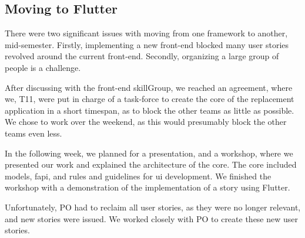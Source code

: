 \subsection{Moving to Flutter} \label{sec:moving-to-flutter}

There were two significant issues with moving from one framework to another, mid-semester. Firstly, implementing a new front-end blocked many user stories revolved around the current front-end. Secondly, organizing a large group of people is a challenge.

After discussing with the front-end \gls{skillGroup}, we reached an agreement, where we, \gls{T11}, were put in charge of a task-force to create the core of the replacement application in a short timespan, as to block the other teams as little as possible. We chose to work over the weekend, as this would presumably block the other teams even less.

In the following week, we planned for a presentation, and a workshop, where we presented our work and explained the architecture of the core. The core included models, \gls{fapi}, and rules and guidelines for \gls{ui} development. We finished the workshop with a demonstration of the implementation of a story using Flutter.

Unfortunately, \gls{PO} had to reclaim all user stories, as they were no longer relevant, and new stories were issued. We worked closely with \gls{PO} to create these new user stories.
